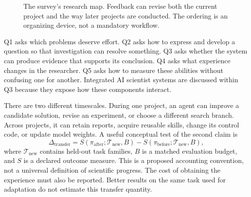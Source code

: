 \begin{figure}[t]
\centering
{}
\caption{The survey's research map. Feedback can revise both the current project and the way later projects are conducted. The ordering is an organizing device, not a mandatory workflow.}
\label{fig:map}
\end{figure}

Q1 asks which problems deserve effort. Q2 asks how to express and develop a question so that investigation can resolve something. Q3 asks whether the system can produce evidence that supports its conclusion. Q4 asks what experience changes in the researcher. Q5 asks how to measure these abilities without confusing one for another. Integrated AI scientist systems are discussed within Q3 because they expose how these components interact.

There are two different timescales. During one project, an agent can improve a candidate solution, revise an experiment, or choose a different search branch. Across projects, it can retain reports, acquire reusable skills, change its control code, or update model weights. A useful conceptual test of the second claim is
\begin{equation}
\Delta_{\mathrm{transfer}} = S(\pi_{\mathrm{after}};\mathcal{T}_{\mathrm{new}},B)-S(\pi_{\mathrm{before}};\mathcal{T}_{\mathrm{new}},B),
\end{equation}
where $\mathcal{T}_{\mathrm{new}}$ contains held-out task families, $B$ is a matched evaluation budget, and $S$ is a declared outcome measure. This is a proposed accounting convention, not a universal definition of scientific progress. The cost of obtaining the experience must also be reported. Better results on the same task used for adaptation do not estimate this transfer quantity.

